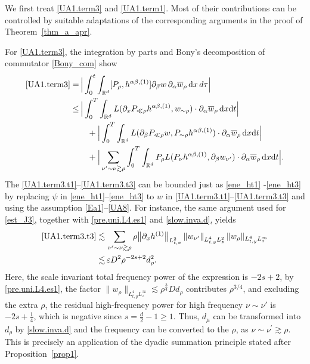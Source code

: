 \documentclass[11pt,letterpaper,reqno]{amsart}
\numberwithin{equation}{section}
\theoremstyle{definition}
\theoremstyle{remark}
\begin{document}
We first treat \eqref{UA1.term3} and \eqref{UA1.term1}. Most of their
contributions can be controlled by suitable adaptations of the corresponding
arguments in the proof of Theorem~\ref{thm_a_apr}.


For \eqref{UA1.term3}, the integration by parts and Bony's decomposition of commutator \eqref{Bony_com} show
\begin{align}
 \eqref{UA1.term3}
        = &\,
        \Big| \int_0^t\int_{\mathbb R^d}
        [P_\rho,h^{\alpha\beta,(1)}]\partial_\beta w
        \,\partial_\alpha\overline{w}_\rho\,\mathrm{d}x\,d\tau \Big | \nonumber\\
\leq  &\,   \Big|   \int_0^T \int_{\mathbb{R}^{d}} L ( \partial_x P_{\ll \rho }  h^{\alpha \beta,(1)},   w_{\sim \rho })\cdot \partial_{\alpha} \overline{w}_{\rho} \,\mathrm{ d} x\mathrm{ d} t \Big|  \label{UA1.term3.t1}\\
	&\quad +  \Big|   \int_0^T \int_{\mathbb{R}^{d}} L (\partial_{ \beta} P_{\ll \rho  }   w, P_{\sim \rho } h^{ \alpha \beta,(1)})\cdot \partial_{\alpha} \overline{w}_{\rho}\, \mathrm{ d} x\mathrm{ d} t \Big|  \label{UA1.term3.t2}\\
	&\quad +\Big| \sum_{\nu^{\prime} \sim \nu \gtrsim \rho }  \int_0^T \int_{\mathbb{R}^{d}} P_{\rho} L( P_{\nu} h^{\alpha \beta,(1)},  \partial _{ \beta}   
 w_{\nu^\prime })\cdot\partial _{\alpha} \overline{w}_{\rho} \,\mathrm{ d} x\mathrm{ d} t\Big|.     \label{UA1.term3.t3}
\end{align}
The \eqref{UA1.term3.t1}--\eqref{UA1.term3.t3} can be bounded just as \eqref{ene_ht1} -\eqref{ene_ht3} by replacing \(\psi\) in \eqref{ene_ht1}--\eqref{ene_ht3} to \(w\)  in  \eqref{UA1.term3.t1}--\eqref{UA1.term3.t3}  and using the assumption \eqref{Ea1}--\eqref{UA8}. For instance, the same
argument used for \eqref{est_J3}, together with
\eqref{pre.uni.L4.es1} and \eqref{slow.inva.d}, yields
\begin{align*}
    \eqref{UA1.term3.t3}  \lesssim &\, \sum_{\nu^{\prime} \sim \nu \gtrsim \rho } \rho \big\|    \partial_x h^{(1)}  \big\|_{L^2_{t,x}}\left\|   w_{\nu^\prime }  \right\|_{L^4_{t,y}L^2_z}  \|   w_{\rho}\|_{L^4_{t,y}L^\infty_z}\\
\lesssim &\,  \varepsilon D^2 \rho^{-2s+2} d_\rho^2.
\end{align*}
Here, the
scale invariant total frequency power of the expression is \(-2s+2\), by \eqref{pre.uni.L4.es1}, the
factor
\(
        \|w_\rho\|_{L^4_{t,y}L^\infty_z}
        \lesssim \rho^{\frac34}D d_\rho
\)
contributes \(\rho^{3/4}\), and excluding the extra \(\rho\), the residual high-frequency power for high frequency \( \nu \sim \nu'\) is
\(-2s+\frac14\), which is negative since \(s=\frac d2-1\ge1\).
 Thus, \( d_\mu \) can be transformed into \( d_\rho\) by \eqref{slow.inva.d} and the frequency can be converted to the \(\rho\), as \( \nu\sim \nu^\prime \gtrsim \rho\). This is precisely an application of the dyadic summation principle stated after Proposition~\ref{prop1}.
\end{document}
